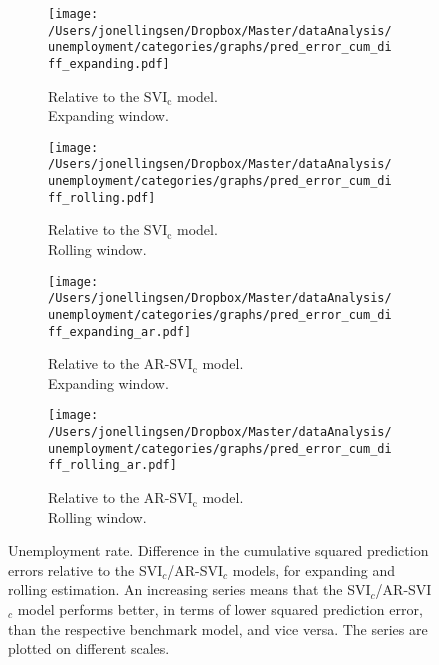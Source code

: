 \begin{figure}[H]
    \centering
    \begin{subfigure}[b]{0.45\textwidth}
\caption{Relative to the $\text{SVI}_\text{c}$ model.\\Expanding window.}
\label{error_diff_urate_categories_plain_expanding}
        \texttt{[image: /Users/jonellingsen/Dropbox/Master/dataAnalysis/unemployment/categories/graphs/pred\_error\_cum\_diff\_expanding.pdf]}
    \end{subfigure}\hfill
    \begin{subfigure}[b]{0.45\textwidth}
\caption{Relative to the $\text{SVI}_\text{c}$ model.\\Rolling window.}
\label{error_diff_urate_categories_plain_rolling}
        \texttt{[image: /Users/jonellingsen/Dropbox/Master/dataAnalysis/unemployment/categories/graphs/pred\_error\_cum\_diff\_rolling.pdf]}
    \end{subfigure}
\begin{subfigure}[b]{0.45\textwidth}
 \caption{Relative to the AR-$\text{SVI}_\text{c}$ model.\\Expanding window.}
\label{error_diff_urate_categories_ar_expanding}       
\texttt{[image: /Users/jonellingsen/Dropbox/Master/dataAnalysis/unemployment/categories/graphs/pred\_error\_cum\_diff\_expanding\_ar.pdf]}
    \end{subfigure}\hfill
\begin{subfigure}[b]{0.45\textwidth}
\caption{Relative to the AR-$\text{SVI}_\text{c}$ model.\\Rolling window.} 
\label{error_diff_urate_categories_ar_rolling}       
\texttt{[image: /Users/jonellingsen/Dropbox/Master/dataAnalysis/unemployment/categories/graphs/pred\_error\_cum\_diff\_rolling\_ar.pdf]}
    \end{subfigure}
\caption{Unemployment rate. Difference in the cumulative squared prediction errors relative to the SVI$_c$/AR-SVI$_c$ models, for expanding and rolling estimation. An increasing series means that the SVI$_c$/AR-SVI$_c$ model performs better, in terms of lower squared prediction error, than the respective benchmark model, and vice versa. The series are plotted on different scales.}
\label{error_diff_urate_categories}
\end{figure} \clearpage

